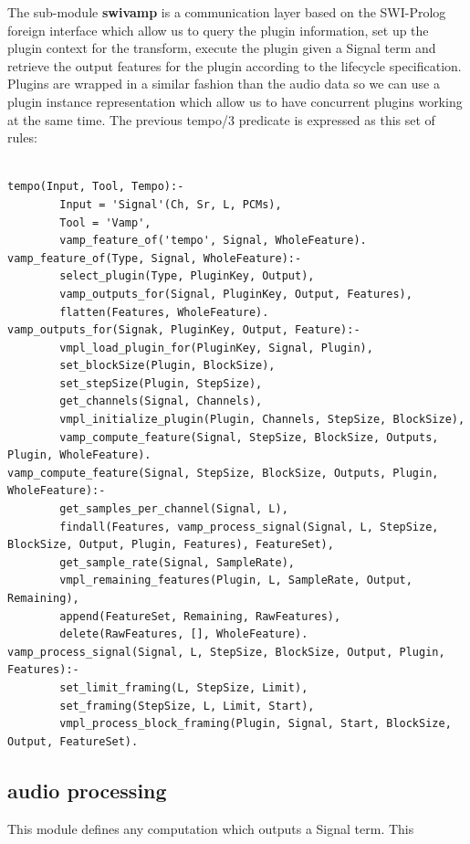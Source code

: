 \documentclass{article}
\begin{document}
The sub-module \textbf{swivamp} is a communication layer based on the SWI-Prolog foreign interface which allow us to query the plugin information, set up the plugin context for the transform, execute the plugin given a Signal term and retrieve the output features for the plugin according to the lifecycle specification. Plugins are wrapped in a similar fashion than the audio data so we can use a plugin instance representation which allow us to have concurrent plugins working at the same time. The previous tempo/3 predicate is expressed as this set of rules:

\begin{verbatim}

tempo(Input, Tool, Tempo):-
        Input = 'Signal'(Ch, Sr, L, PCMs),
        Tool = 'Vamp',
        vamp_feature_of('tempo', Signal, WholeFeature).
vamp_feature_of(Type, Signal, WholeFeature):-
        select_plugin(Type, PluginKey, Output),
        vamp_outputs_for(Signal, PluginKey, Output, Features),
        flatten(Features, WholeFeature).
vamp_outputs_for(Signak, PluginKey, Output, Feature):-
        vmpl_load_plugin_for(PluginKey, Signal, Plugin),
        set_blockSize(Plugin, BlockSize),
        set_stepSize(Plugin, StepSize),
        get_channels(Signal, Channels),
        vmpl_initialize_plugin(Plugin, Channels, StepSize, BlockSize),
        vamp_compute_feature(Signal, StepSize, BlockSize, Outputs, Plugin, WholeFeature).
vamp_compute_feature(Signal, StepSize, BlockSize, Outputs, Plugin, WholeFeature):-
        get_samples_per_channel(Signal, L),
        findall(Features, vamp_process_signal(Signal, L, StepSize, BlockSize, Output, Plugin, Features), FeatureSet),
        get_sample_rate(Signal, SampleRate),
        vmpl_remaining_features(Plugin, L, SampleRate, Output, Remaining),
        append(FeatureSet, Remaining, RawFeatures),
        delete(RawFeatures, [], WholeFeature).
vamp_process_signal(Signal, L, StepSize, BlockSize, Output, Plugin, Features):-
        set_limit_framing(L, StepSize, Limit),
        set_framing(StepSize, L, Limit, Start),
        vmpl_process_block_framing(Plugin, Signal, Start, BlockSize, Output, FeatureSet).

\end{verbatim}

\subsection{audio processing}

This module defines any computation which outputs a Signal term. This 
\end{document}

